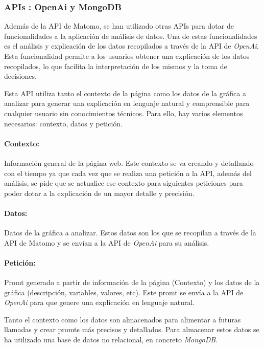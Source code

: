 \subsubsection{APIs : OpenAi y MongoDB}
\label{sec:apis}

Además de la API de Matomo, se han utilizado otras APIs para dotar de funcionalidades a la aplicación de análisis de datos.
Una de estas funcionalidades es el análisis y explicación de los datos recopilados a través de la API de \textit{OpenAi}. Esta funcionalidad
permite a los usuarios obtener una explicación de los datos recopilados, lo que facilita la interpretación de los mismos y la toma
de decisiones. 

Esta API utiliza tanto el contexto de la página como los datos de la gráfica a analizar para generar una explicación en lenguaje natural y
comprensible para cualquier usuario sin conocimientos técnicos. Para ello, hay varios elementos necesarios: contexto, datos y petición. 

\paragraph{Contexto: } Información general de la página web. Este contexto se va creando y detallando con el tiempo ya que cada vez
que se realiza una petición a la API, además del análisis, se pide que se actualice ese contexto para siguientes peticiones para poder dotar
a la explicación de un mayor detalle y precisión. 

\paragraph{Datos: } Datos de la gráfica a analizar. Estos datos son los que se recopilan a través de la API de Matomo y se envían a la API
de \textit{OpenAi} para su análisis.

\paragraph{Petición: } Promt generado a partir de información de la página (Contexto) y los datos de la gráfica (descripción, variables, valores, etc).
Este promt se envía a la API de \textit{OpenAi} para que genere una explicación en lenguaje natural.

Tanto el contexto como los datos son almacenados para alimentar a futuras llamadas y crear promts más precisos y detallados. Para almacenar
estos datos se ha utilizado una base de datos no relacional, en concreto \textit{MongoDB}. 

